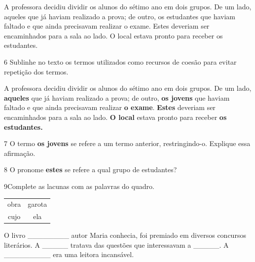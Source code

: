 {\begin{myquote}

A professora decidiu dividir os alunos do sétimo ano em dois grupos. De um
lado, aqueles que já haviam realizado a prova; de outro, os estudantes que
haviam faltado e que ainda precisavam realizar o exame. Estes deveriam
ser encaminhados para a sala ao lado. O local estava pronto para receber
os estudantes.

\end{myquote}

\num{6} Sublinhe no texto os termos utilizados como recursos de coesão para
evitar repetição dos termos. 

\begin{myquote}
A professora decidiu dividir os alunos do sétimo ano em dois grupos. De um
lado, \textbf{aqueles} que já haviam realizado a prova; de outro, \textbf{os
jovens} que haviam faltado e que ainda precisavam realizar \textbf{o
exame}. \textbf{Estes} deveriam ser encaminhados para a sala ao lado.
\textbf{O local} estava pronto para receber \textbf{os estudantes.}
\end{myquote}


\num{7} O termo \textbf{os jovens} se refere a um termo anterior, restringindo-o. 
Explique essa afirmação.


\num{8} O pronome \textbf{estes} se refere a qual grupo de estudantes?


\num{9}Complete as lacunas com as palavras do quadro.

\begin{table}[h!]
\begin{tabular}{cc}
obra & garota \\
cujo & ela
\end{tabular}
\end{table}

O livro \_\_\_\_\_\_\_\_ autor Maria conhecia, foi premiado em diversos
concursos literários. A \_\_\_\_\_ tratava das questões que interessavam
a \_\_\_\_\_. A \_\_\_\_\_\_\_\_\_ era uma leitora incansável.


}
